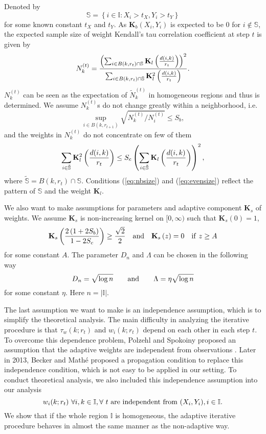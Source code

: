 \documentclass[10pt,twocolumn,twoside]{IEEEtran}
\def\II{{\mathbb I}}
\def\SS{\mathbb{S}}
\def\bK{\mathbf K}
\begin{document}
Denoted by
$$
\SS=\left\{i\in\II:X_i>t_X,Y_i>t_Y\right\}
$$
for some known constant $t_X$ and $t_Y$. As $\bK_b(X_i,Y_i)$ is expected to be $0$ for $i\notin \SS$, the expected sample size of weight Kendall's tau correlation coefficient at step $t$ is given by
$$
N^{(t)}_k={\left(\sum_{i\in B(k,r_t)\cap \SS}\bK_l\left(d(i,k)\over r_t\right)\right)^2 \over \sum_{i\in B(k,r_t)\cap \SS}\bK_l^2\left(d(i,k)\over r_t\right)}.
$$
$N^{(t)}_k$ can be seen as the expectation of $\tilde{N}^{(t)}_k$ in homogeneous regions and thus is determined. We assume $N^{(t)}_k$s do not change greatly within a neighborhood, i.e.
\begin{equation}
\label{eq:nbsize}
\sup_{i\in B(k,r_{t+1})} \sqrt{N^{(t)}_k/N^{(t)}_i}\le S_b,
\end{equation}
and the weights in $N^{(t)}_k$ do not concentrate on few of them
\begin{equation}
\label{eq:evensize}
\sum_{i\in \tilde{\SS}}\bK_l^2\left(d(i,k)\over r_t\right)\le S_c\left(\sum_{i\in \tilde{\SS}}\bK_l\left(d(i,k)\over r_t\right)\right)^2,
\end{equation}
where $\tilde{\SS}=B(k,r_t)\cap \SS$.
Conditions (\ref{eq:nbsize}) and (\ref{eq:evensize}) reflect the pattern of $\SS$ and the weight $\bK_l$.

We also want to make assumptions for parameters and adaptive component $\bK_s$ of weights. We assume $\bK_s$ is non-increasing kernel on $[0,\infty)$ such that $\bK_s(0)=1$,
\begin{equation}
\label{eq:adkernel}
\bK_s\left( 2\left(1+2S_b\right) \over 1-2S_c\right)\ge {\sqrt{2}\over 2}\quad {\rm and}\quad \bK_s\left( z\right)=0\quad {\rm if}\ z\ge A
\end{equation}
for some constant $A$. The parameter $D_n$ and $\Lambda$ can be chosen in the following way
\begin{equation}
\label{eq:para}
D_n=\sqrt{\log n}\qquad {\rm and}\qquad \Lambda=\eta\sqrt{\log n}
\end{equation}
for some constant $\eta$. Here $n=|\II|$.

The last assumption we want to make is an independence assumption, which is to simplify the theoretical analysis. The main difficulty in analyzing the iterative procedure is that $\tau_w(k;r_t)$ and $w_i(k;r_t)$ depend on each other in each step $t$. To overcome this dependence problem, Polzehl and Spokoiny proposed an assumption that the adaptive weights are independent from observations \cite{Polzehl2006}. Later in 2013, Becker and Math{\'e} proposed a propagation condition to replace this independence condition, which is not easy to be applied in our setting. To conduct theoretical analysis, we also included this independence assumption into our analysis
\begin{equation}
\label{eq:indep}
w_i(k;r_t)\ \forall i,k\in\II, \forall\ t\ {\rm are\ independent\ from\ }(X_i,Y_i), i\in \II.
\end{equation}
We show that if the whole region $\II$ is homogeneous, the adaptive iterative procedure behaves in almost the same manner as the non-adaptive way. 
\end{document}
